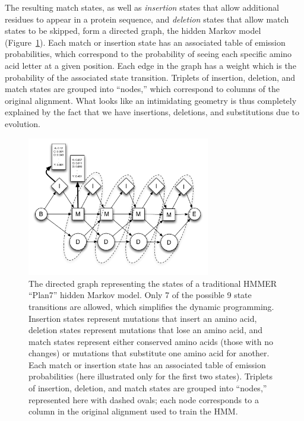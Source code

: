 \documentclass[preprint]{sigplanconf}
\begin{document}
The resulting match states, as well as \textit{insertion} states that allow 
additional residues to appear in a protein sequence, and \textit{deletion} 
states that allow match states to be skipped, form a directed graph, the hidden 
Markov model (Figure~\ref{plan7}). Each match or insertion state has an 
associated table of emission probabilities, which correspond to the probability 
of seeing each specific amino acid letter at a given position. Each edge in the 
graph has a weight which is the probability of the associated state transition. 
Triplets of insertion, deletion, and match states are grouped into ``nodes,'' 
which correspond to columns of the original alignment. What looks like an 
intimidating geometry is thus completely explained by the fact that we have 
insertions, deletions, and substitutions due to evolution.

\begin{figure} \centerline{\includegraphics[width=8cm]{Plan7.pdf}} \caption{The 
directed graph representing the states of a traditional HMMER ``Plan7'' hidden 
Markov model. Only 7 of the possible 9 state transitions are allowed, which 
simplifies the dynamic programming. Insertion states represent mutations that 
insert an amino acid, deletion states represent mutations that lose an amino 
acid, and match states represent either conserved amino acids (those with no 
changes) or mutations that substitute one amino acid for another. Each match or 
insertion state has an associated table of emission probabilities (here 
illustrated only for the first two states). Triplets of insertion, deletion, 
and match states are grouped into ``nodes,'' represented here with dashed 
ovals; each node corresponds to a column in the original alignment used to 
train the HMM.}\label{plan7} \end{figure}
\end{document}
